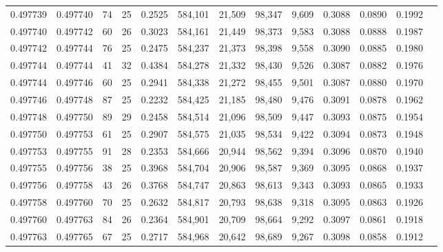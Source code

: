 \begin{tabular}{rrrrrrrrrrrrr}
0.497739 & 0.497740 &  74 &  25 &                                     0.2525 & 584,101 &  21,509 &  98,347 &   9,609 & 0.3088 & 0.0890 & 0.1992 \\
0.497740 & 0.497742 &  60 &  26 &                                     0.3023 & 584,161 &  21,449 &  98,373 &   9,583 & 0.3088 & 0.0888 & 0.1987 \\
0.497742 & 0.497744 &  76 &  25 &                                     0.2475 & 584,237 &  21,373 &  98,398 &   9,558 & 0.3090 & 0.0885 & 0.1980 \\
0.497744 & 0.497744 &  41 &  32 &                                     0.4384 & 584,278 &  21,332 &  98,430 &   9,526 & 0.3087 & 0.0882 & 0.1976 \\
0.497744 & 0.497746 &  60 &  25 &                                     0.2941 & 584,338 &  21,272 &  98,455 &   9,501 & 0.3087 & 0.0880 & 0.1970 \\
0.497746 & 0.497748 &  87 &  25 &                                     0.2232 & 584,425 &  21,185 &  98,480 &   9,476 & 0.3091 & 0.0878 & 0.1962 \\
0.497748 & 0.497750 &  89 &  29 &                                     0.2458 & 584,514 &  21,096 &  98,509 &   9,447 & 0.3093 & 0.0875 & 0.1954 \\
0.497750 & 0.497753 &  61 &  25 &                                     0.2907 & 584,575 &  21,035 &  98,534 &   9,422 & 0.3094 & 0.0873 & 0.1948 \\
0.497753 & 0.497755 &  91 &  28 &                                     0.2353 & 584,666 &  20,944 &  98,562 &   9,394 & 0.3096 & 0.0870 & 0.1940 \\
0.497755 & 0.497756 &  38 &  25 &                                     0.3968 & 584,704 &  20,906 &  98,587 &   9,369 & 0.3095 & 0.0868 & 0.1937 \\
0.497756 & 0.497758 &  43 &  26 &                                     0.3768 & 584,747 &  20,863 &  98,613 &   9,343 & 0.3093 & 0.0865 & 0.1933 \\
0.497758 & 0.497760 &  70 &  25 &                                     0.2632 & 584,817 &  20,793 &  98,638 &   9,318 & 0.3095 & 0.0863 & 0.1926 \\
0.497760 & 0.497763 &  84 &  26 &                                     0.2364 & 584,901 &  20,709 &  98,664 &   9,292 & 0.3097 & 0.0861 & 0.1918 \\
0.497763 & 0.497765 &  67 &  25 &                                     0.2717 & 584,968 &  20,642 &  98,689 &   9,267 & 0.3098 & 0.0858 & 0.1912 \\

\end{tabular}

